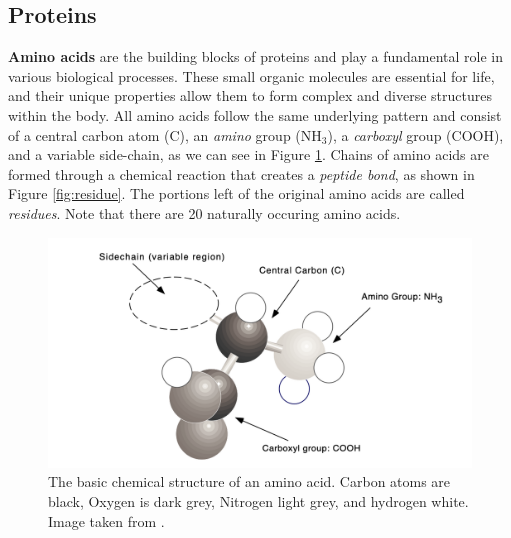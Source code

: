 \subsection{Proteins}
\textbf{Amino acids} are the building blocks of proteins and play a fundamental role in various biological processes. These small organic molecules are essential for life, and their unique properties allow them to form complex and diverse structures within the body. 
All amino acids follow the same underlying pattern and consist of a central carbon atom (C), an \textit{amino} group ($\text{NH}_3$), a \textit{carboxyl} group (COOH), and a variable side-chain, as we can see in Figure \ref{fig:amino-acid}.
Chains of amino acids are formed through a chemical reaction that creates a \textit{peptide bond}, as shown in Figure \ref{fig:residue}. The portions left of the original amino acids are called \textit{residues}. Note that there are 20 naturally occuring amino acids.
\begin{figure}
    \centering
    \includegraphics[scale=0.5]{figures/amino-acid.png}
    \caption{The basic chemical structure of an amino acid. Carbon atoms are black, Oxygen is dark grey, Nitrogen light grey, and hydrogen white. Image taken from \cite{hunter1993molecular}.}
    \label{fig:amino-acid}
\end{figure}

